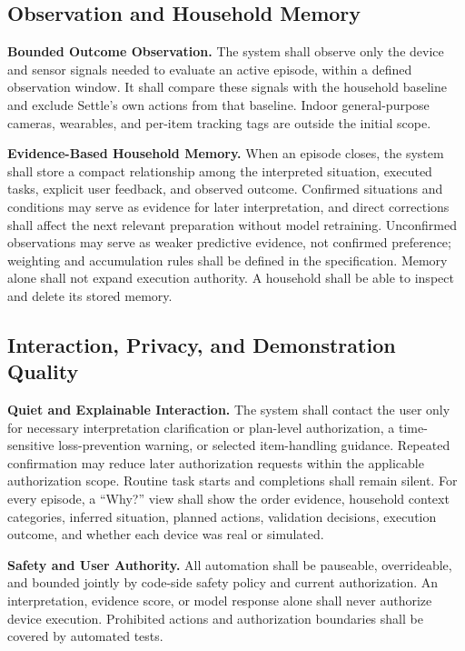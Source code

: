 \documentclass[conference]{IEEEtran}
\newcommand{\req}[1]{\par\addvspace{3pt}\noindent\textbf{#1}}
\begin{document}
\subsection{Observation and Household Memory}

\req{Bounded Outcome Observation.}
The system shall observe only the device and sensor signals needed to evaluate an active episode, within a defined observation window. It shall compare these signals with the household baseline and exclude Settle's own actions from that baseline. Indoor general-purpose cameras, wearables, and per-item tracking tags are outside the initial scope.

\req{Evidence-Based Household Memory.}
When an episode closes, the system shall store a compact relationship among the interpreted situation, executed tasks, explicit user feedback, and observed outcome. Confirmed situations and conditions may serve as evidence for later interpretation, and direct corrections shall affect the next relevant preparation without model retraining. Unconfirmed observations may serve as weaker predictive evidence, not confirmed preference; weighting and accumulation rules shall be defined in the specification. Memory alone shall not expand execution authority. A household shall be able to inspect and delete its stored memory.

\subsection{Interaction, Privacy, and Demonstration Quality}

\req{Quiet and Explainable Interaction.}
The system shall contact the user only for necessary interpretation clarification or plan-level authorization, a time-sensitive loss-prevention warning, or selected item-handling guidance. Repeated confirmation may reduce later authorization requests within the applicable authorization scope. Routine task starts and completions shall remain silent. For every episode, a ``Why?'' view shall show the order evidence, household context categories, inferred situation, planned actions, validation decisions, execution outcome, and whether each device was real or simulated.

\balance
\req{Safety and User Authority.}
All automation shall be pauseable, overrideable, and bounded jointly by code-side safety policy and current authorization. An interpretation, evidence score, or model response alone shall never authorize device execution. Prohibited actions and authorization boundaries shall be covered by automated tests.
\end{document}
